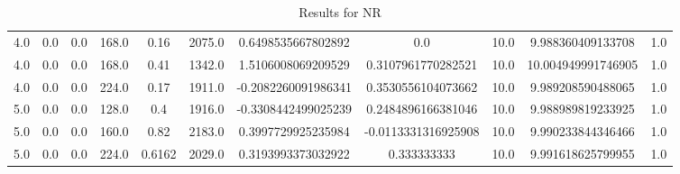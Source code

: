 \begin{table}[htbp]
\begin{tabular}{|l|c|c|c|c|c|c|c|c|c|c|}
4.0 & 0.0 & 0.0 & 168.0 & 0.16 & 2075.0 & 0.6498535667802892 & 0.0 & 10.0 & 9.988360409133708 & 1.0 \\
4.0 & 0.0 & 0.0 & 168.0 & 0.41 & 1342.0 & 1.5106008069209529 & 0.3107961770282521 & 10.0 & 10.004949991746905 & 1.0 \\
4.0 & 0.0 & 0.0 & 224.0 & 0.17 & 1911.0 & -0.2082260091986341 & 0.3530556104073662 & 10.0 & 9.989208590488065 & 1.0 \\
5.0 & 0.0 & 0.0 & 128.0 & 0.4 & 1916.0 & -0.3308442499025239 & 0.2484896166381046 & 10.0 & 9.988989819233925 & 1.0 \\
5.0 & 0.0 & 0.0 & 160.0 & 0.82 & 2183.0 & 0.3997729925235984 & -0.0113331316925908 & 10.0 & 9.990233844346466 & 1.0 \\
5.0 & 0.0 & 0.0 & 224.0 & 0.6162 & 2029.0 & 0.3193993373032922 & 0.333333333 & 10.0 & 9.991618625799955 & 1.0 \\
\hline
\end{tabular}
\caption{Results for NR}
\label{tab:NR_results}
\end{table}
\clearpage
